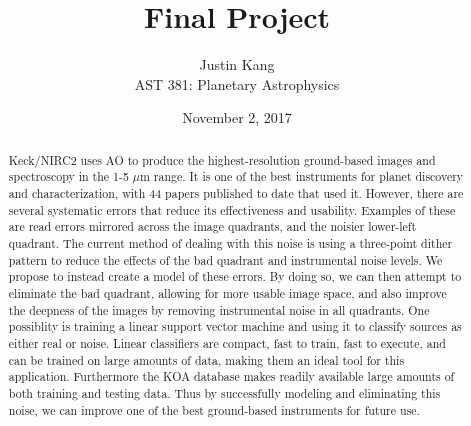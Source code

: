 \documentclass[12pt]{article}
\title{\large \textbf{Final Project}}
\author{{\myfont Justin Kang}\\ {\myfont AST 381: Planetary Astrophysics}}
\date{\vspace{-0.75em} {\myfont November 2, 2017}}
\begin{document}
\maketitle


\begin{abstract}
\noindent Keck/NIRC2 uses AO to produce the highest-resolution ground-based images and spectroscopy in the 1-5 $\mu$m range. It is one of the best instruments for planet discovery and characterization, with 44 papers published to date that used it. However, there are several systematic errors that reduce its effectiveness and usability. Examples of these are read errors mirrored across the image quadrants, and the noisier lower-left quadrant. The current method of dealing with this noise is using a three-point dither pattern to reduce the effects of the bad quadrant and instrumental noise levels. We propose to instead create a model of these errors. By doing so, we can then attempt to eliminate the bad quadrant, allowing for more usable image space, and also improve the deepness of the images by removing instrumental noise in all quadrants. One possiblity is training a linear support vector machine and using it to classify sources as either real or noise. Linear classifiers are compact, fast to train, fast to execute, and can be trained on large amounts of data, making them an ideal tool for this application. Furthermore the KOA database makes readily available large amounts of both training and testing data. Thus by successfully modeling and eliminating this noise, we can improve one of the best ground-based instruments for future use.
\end{abstract}
\end{document}
